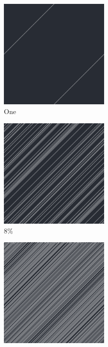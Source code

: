 \documentclass[12pt, fleqn]{report}                             %
\theoremstyle{break}                                            %
\begin{document}
      \begin{figure}[ht!]
        \centering
        \begin{subfigure}[b]{0.4\linewidth}
          \includegraphics[width=0.6\textwidth]{Images/134/a.png}
          \caption{One}
        \end{subfigure}
        \begin{subfigure}[b]{0.4\linewidth}
          \includegraphics[width=0.6\textwidth]{Images/134/b.png}
          \caption{8\%}
        \end{subfigure}
        \begin{subfigure}[b]{0.4\linewidth}
          \includegraphics[width=0.6\textwidth]{Images/134/c.png}

\end{subfigure}
\end{figure}
\end{document}
